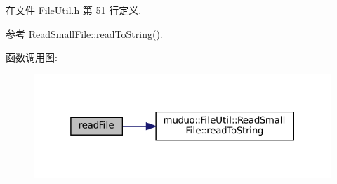 在文件 File\+Util.\+h 第 51 行定义.



参考 Read\+Small\+File\+::read\+To\+String().

函数调用图\+:
\nopagebreak
\begin{figure}[H]
\begin{center}
\leavevmode
\includegraphics[width=319pt]{namespacemuduo_1_1FileUtil_a14a3368f5012ffe7b1004ef5b897fbbe_cgraph}
\end{center}
\end{figure}
